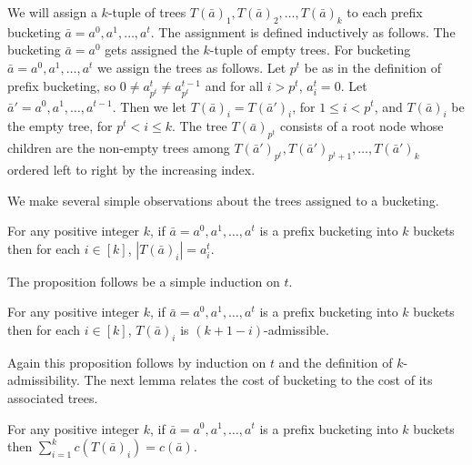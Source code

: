 \documentclass[runningheads,a4paper]{llncs}
\begin{document}
We will assign a $k$-tuple of trees $T(\bar{a})_1,T(\bar{a})_2,\dots,T(\bar{a})_k$ to each prefix bucketing $\bar{a} = a^0,a^1,\dots,a^t$. The assignment is
defined inductively as follows. The bucketing $\bar{a} = a^0$ gets assigned the $k$-tuple of empty trees. For bucketing $\bar{a} = a^0,a^1,\dots,a^t$
we assign the trees as follows. Let $p^t$ be as in the definition of prefix bucketing, so $0 \not= a^t_{p^t} \not= a^{t-1}_{p^t}$ and for all $i>p^t$, $a^t_i = 0$.
Let $\bar{a}'=a^0,a^1,\dots,a^{t-1}$.
Then we let $T(\bar{a})_i = T(\bar{a}')_i$, for $1\le i < p^t$, and $T(\bar{a})_i$ be the empty tree, for $p^t < i \le k$. The tree $T(\bar{a})_{p^t}$ consists of
a root node whose children are the non-empty trees among $T(\bar{a}')_{p^t},T(\bar{a}')_{p^t+1},\dots,T(\bar{a}')_k$ ordered left to right by the increasing index.

We make several simple observations about the trees assigned to a bucketing. 

\begin{proposition}\label{p-ts}
For any positive integer $k$, if $\bar{a} = a^0,a^1,\dots,a^t$ is a prefix bucketing into $k$ buckets
then for each $i\in [k]$, $|T(\bar{a})_i| = a^t_i$.
\end{proposition}

The proposition follows be a simple induction on $t$.

\begin{proposition}\label{p-ta}
For any positive integer $k$, if $\bar{a} = a^0,a^1,\dots,a^t$ is a prefix bucketing into $k$ buckets then
for each $i\in [k]$, $T(\bar{a})_i$ is $(k+1-i)$-admissible.
\end{proposition}

Again this proposition follows by induction on $t$ and the definition of $k$-admissibility. The next lemma relates
the cost of bucketing to the cost of its associated trees.

\begin{lemma}\label{l-tc}
For any positive integer $k$, if $\bar{a} = a^0,a^1,\dots,a^t$ is a prefix bucketing into $k$ buckets then
 $\sum_{i=1}^k c(T(\bar{a})_i) = c(\bar{a})$.
\end{lemma}
\end{document}

